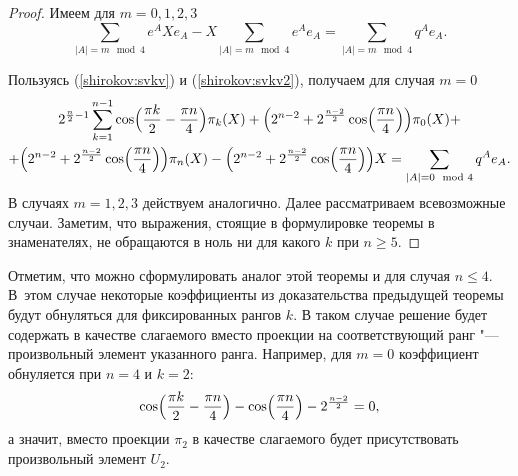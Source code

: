 \begin{proof} Имеем для $m=0, 1, 2, 3$
$$\sum_{|A|=m\mod4}e^A X e_A-X \sum_{|A|=m\mod 4}e^A e_A=\sum_{|A|=m\mod 4}q^A e_A.$$

Пользуясь (\ref{shirokov:svkv}) и (\ref{shirokov:svkv2}), получаем для случая $m=0$
\begin{multline}
2^{\frac{n}{2}-1}\sum_{k=1}^{n-1}\cos\Bigl(\frac{\pi k}{2}-\frac{\pi n}{4}\Bigr)\pi_k(X)+
\Bigl(2^{n-2}+2^{\frac{n-2}{2}}\cos\Bigl(\frac{\pi n}{4}\Bigr)\Bigr)\pi_0(X) +
\\
+\Bigl(2^{n-2}+2^{\frac{n-2}{2}}\cos\Bigl(\frac{\pi n}{4}\Bigr)\Bigr)\pi_n(X)-
\Bigl(2^{n-2}+2^{\frac{n-2}{2}}\cos\Bigl(\frac{\pi n}{4}\Bigr)\Bigr)X=\sum_{|A|=0\mod 4}q^A e_A.
\end{multline}
В случаях $m=1, 2, 3$ действуем аналогично.
Далее рассматриваем всевозможные случаи. Заметим, что выражения, стоящие в формулировке теоремы в знаменателях, не обращаются в ноль ни для какого $k$ при $n\geq 5$.
\end{proof}

\smallskip


Отметим, что можно сформулировать аналог этой теоремы и для случая $n\leq 4$. 
В~этом случае некоторые коэффициенты из доказательства предыдущей теоремы будут обнуляться для фиксированных рангов $k$. 
В таком случае решение будет содержать в качестве слагаемого вместо проекции на соответствующий ранг "--- произвольный элемент указанного ранга. Например, для $m=0$ коэффициент обнуляется при $n=4$ и $k=2$: 
$$\cos\Bigl(\frac{\pi k}{2}-\frac{\pi n}{4}\Bigr)-\cos\Bigl(\frac{\pi n}{4}\Bigr)-2^{\frac{n-2}{2}}=0,
$$ 
а значит, вместо проекции $\pi_2$ в качестве слагаемого будет присутствовать произвольный элемент $U_2$.

